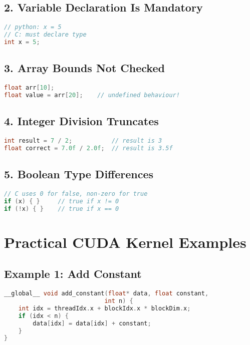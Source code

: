 \documentclass[11pt, a4paper]{article}
\begin{document}
\subsection*{2. Variable Declaration Is Mandatory}
\begin{lstlisting}[language=C]
// python: x = 5
// C: must declare type
int x = 5;
\end{lstlisting}

\subsection*{3. Array Bounds Not Checked}
\begin{lstlisting}[language=C]
float arr[10];
float value = arr[20];    // undefined behaviour!
\end{lstlisting}

\subsection*{4. Integer Division Truncates}
\begin{lstlisting}[language=C]
int result = 7 / 2;           // result is 3
float correct = 7.0f / 2.0f;  // result is 3.5f
\end{lstlisting}

\subsection*{5. Boolean Type Differences}
\begin{lstlisting}[language=C]
// C uses 0 for false, non-zero for true
if (x) { }     // true if x != 0
if (!x) { }    // true if x == 0
\end{lstlisting}

\section*{Practical CUDA Kernel Examples}

\subsection*{Example 1: Add Constant}
\begin{lstlisting}[language=C]
__global__ void add_constant(float* data, float constant,
                            int n) {
    int idx = threadIdx.x + blockIdx.x * blockDim.x;
    if (idx < n) {
        data[idx] = data[idx] + constant;
    }
}
\end{lstlisting}
\end{document}
